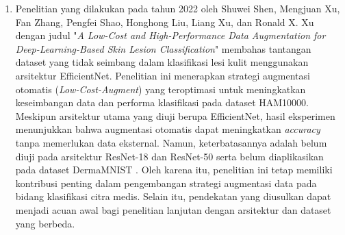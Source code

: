 \begin{enumerate}[noitemsep]
	\item Penelitian yang dilakukan pada tahun 2022 oleh Shuwei Shen, 
	Mengjuan Xu, Fan Zhang, Pengfei Shao, Honghong Liu, Liang Xu, dan 
	Ronald X. Xu dengan judul "\textit{A Low-Cost and High-Performance 
	Data Augmentation for Deep-Learning-Based Skin Lesion Classification}"
	membahas  tantangan dataset yang tidak seimbang dalam klasifikasi lesi 
	kulit menggunakan arsitektur EfficientNet. Penelitian ini menerapkan 
	strategi augmentasi otomatis (\textit{Low-Cost-Augment}) yang 
	teroptimasi untuk meningkatkan keseimbangan data dan performa 
	klasifikasi pada dataset HAM10000. Meskipun arsitektur utama yang 
	diuji berupa EfficientNet, hasil eksperimen menunjukkan bahwa 
	augmentasi otomatis dapat meningkatkan \textit{accuracy} tanpa 
	memerlukan data eksternal. Namun, keterbatasannya adalah belum diuji 
	pada arsitektur ResNet-18 dan ResNet-50 serta belum diaplikasikan pada 
	dataset DermaMNIST \cite{xuronald2022low}. Oleh karena itu, penelitian 
	ini tetap memiliki kontribusi penting dalam pengembangan strategi 
	augmentasi data pada bidang klasifikasi citra medis. Selain itu, 
	pendekatan yang diusulkan dapat menjadi acuan awal bagi penelitian 
	lanjutan dengan arsitektur dan dataset yang berbeda.
\end{enumerate}

